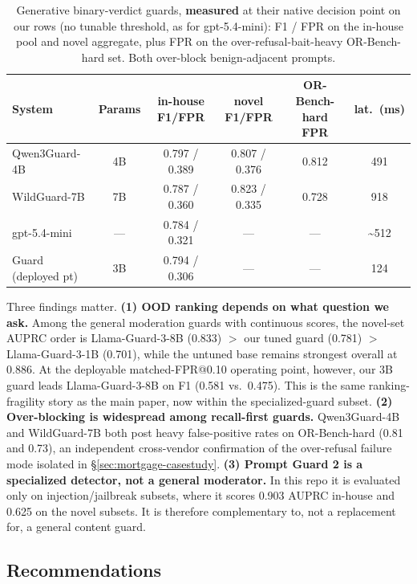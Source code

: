 \begin{table}[t]
\small\centering\setlength{\tabcolsep}{4pt}
\caption{Generative binary-verdict guards, \textbf{measured} at their native decision point on our rows (no tunable threshold, as for gpt-5.4-mini): F1 / FPR on the in-house pool and novel aggregate, plus FPR on the over-refusal-bait-heavy OR-Bench-hard set. Both over-block benign-adjacent prompts.}
\label{tab:gr-native}
\begin{tabular}{lccccc}
\toprule
System & Params & in-house F1/FPR & novel F1/FPR & OR-Bench-hard FPR & lat.\ (ms) \\
\midrule
Qwen3Guard-4B & 4B & 0.797 / 0.389 & 0.807 / 0.376 & 0.812 & 491 \\
WildGuard-7B  & 7B & 0.787 / 0.360 & 0.823 / 0.335 & 0.728 & 918 \\
gpt-5.4-mini  & --- & 0.784 / 0.321 & --- & --- & \textasciitilde{}512 \\
Guard (deployed pt) & 3B & 0.794 / 0.306 & --- & --- & 124 \\
\bottomrule
\end{tabular}
\end{table}

Three findings matter. \textbf{(1) OOD ranking depends on what question we ask.} Among the general moderation guards with continuous scores, the novel-set AUPRC order is Llama-Guard-3-8B (0.833) $>$ our tuned guard (0.781) $>$ Llama-Guard-3-1B (0.701), while the untuned base remains strongest overall at 0.886. At the deployable matched-FPR@0.10 operating point, however, our 3B guard leads Llama-Guard-3-8B on F1 (0.581 vs.\ 0.475). This is the same ranking-fragility story as the main paper, now within the specialized-guard subset. \textbf{(2) Over-blocking is widespread among recall-first guards.} Qwen3Guard-4B and WildGuard-7B both post heavy false-positive rates on OR-Bench-hard (0.81 and 0.73), an independent cross-vendor confirmation of the over-refusal failure mode isolated in \S\ref{sec:mortgage-casestudy}. \textbf{(3) Prompt Guard 2 is a specialized detector, not a general moderator.} In this repo it is evaluated only on injection/jailbreak subsets, where it scores 0.903 AUPRC in-house and 0.625 on the novel subsets. It is therefore complementary to, not a replacement for, a general content guard.

\subsection{Recommendations}
\label{sec:recommendations}


